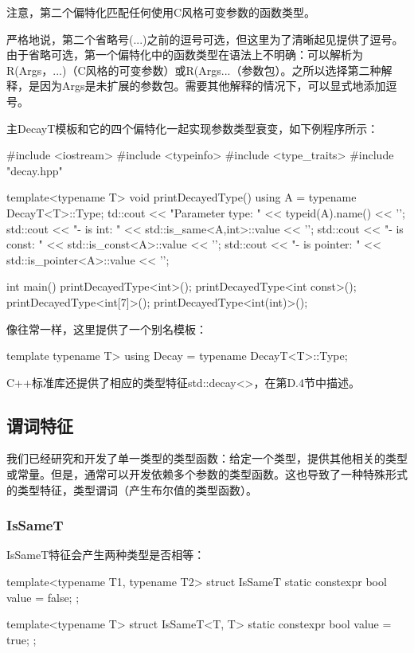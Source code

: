 注意，第二个偏特化匹配任何使用C风格可变参数的函数类型。

\begin{notice}
严格地说，第二个省略号(...)之前的逗号可选，但这里为了清晰起见提供了逗号。由于省略可选，第一个偏特化中的函数类型在语法上不明确：可以解析为R(Args，...)（C风格的可变参数）或R(Args...（参数包）。之所以选择第二种解释，是因为Args是未扩展的参数包。需要其他解释的情况下，可以显式地添加逗号。
\end{notice}

主DecayT模板和它的四个偏特化一起实现参数类型衰变，如下例程序所示：

\begin{cpp}
#include <iostream>
#include <typeinfo>
#include <type_traits>
#include "decay.hpp"

template<typename T>
void printDecayedType()
{
	using A = typename DecayT<T>::Type;
	td::cout << "Parameter type: " << typeid(A).name() << '\n';
	std::cout << "- is int: " << std::is_same<A,int>::value << '\n';
	std::cout << "- is const: " << std::is_const<A>::value << '\n';
	std::cout << "- is pointer: " << std::is_pointer<A>::value << '\n';
}

int main()
{
	printDecayedType<int>();
	printDecayedType<int const>();
	printDecayedType<int[7]>();
	printDecayedType<int(int)>();
}
\end{cpp}

像往常一样，这里提供了一个别名模板：

\begin{cpp}
template typename T>
using Decay = typename DecayT<T>::Type;
\end{cpp}

C++标准库还提供了相应的类型特征std::decay<>，在第D.4节中描述。

\subsection{谓词特征}

我们已经研究和开发了单一类型的类型函数：给定一个类型，提供其他相关的类型或常量。但是，通常可以开发依赖多个参数的类型函数。这也导致了一种特殊形式的类型特征，类型谓词（产生布尔值的类型函数）。

\subsubsection{IsSameT}

IsSameT特征会产生两种类型是否相等：

\begin{cpp}
template<typename T1, typename T2>
struct IsSameT {
	static constexpr bool value = false;
};

template<typename T>
struct IsSameT<T, T> {
	static constexpr bool value = true;
};
\end{cpp}

